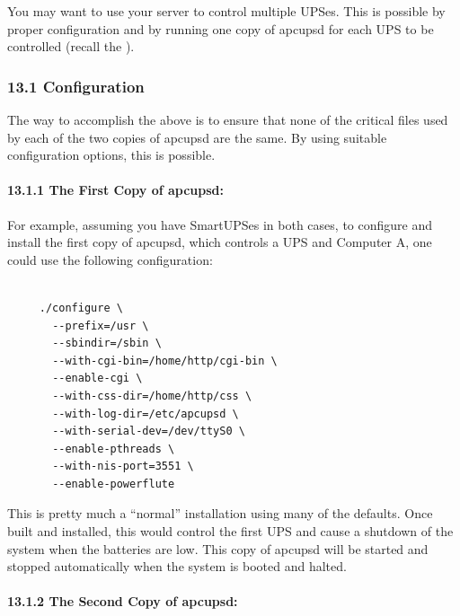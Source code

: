 You may want to use your server to control multiple UPSes. This is possible by
proper configuration and by running one copy of apcupsd for each UPS to be
controlled (recall the 
). 

\label{Configuration}

\subsubsection*{13.1 Configuration}

The way to accomplish the above is to ensure that none of the critical files
used by each of the two copies of apcupsd are the same. By using suitable
configuration options, this is possible. 

\label{The-First-Copy-of-apcupsd}

\paragraph*{13.1.1 The First Copy of apcupsd:}

For example, assuming you have SmartUPSes in both cases, to configure and
install the first copy of apcupsd, which controls a UPS and Computer A, one
could use the following configuration: 

\footnotesize
\begin{verbatim}
     
     ./configure \
       --prefix=/usr \
       --sbindir=/sbin \
       --with-cgi-bin=/home/http/cgi-bin \
       --enable-cgi \
       --with-css-dir=/home/http/css \
       --with-log-dir=/etc/apcupsd \
       --with-serial-dev=/dev/ttyS0 \
       --enable-pthreads \
       --with-nis-port=3551 \
       --enable-powerflute
\end{verbatim}
\normalsize

This is pretty much a ``normal'' installation using many of the defaults. Once
built and installed, this would control the first UPS and cause a shutdown of
the system when the batteries are low.  This copy of apcupsd will be started
and stopped automatically when the system is booted and halted. 

\label{The-Second-Copy-of-apcupsd}

\paragraph*{13.1.2 The Second Copy of apcupsd:}

